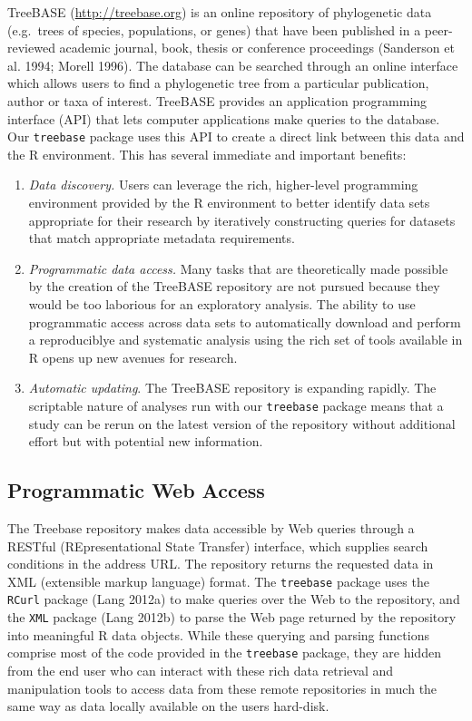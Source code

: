 TreeBASE (\href{http://treebase.org}{http://treebase.org}) is an online
repository of phylogenetic data (e.g.~trees of species, populations, or
genes) that have been published in a peer-reviewed academic journal,
book, thesis or conference proceedings (Sanderson et al. 1994; Morell
1996). The database can be searched through an online interface which
allows users to find a phylogenetic tree from a particular publication,
author or taxa of interest. TreeBASE provides an application programming
interface (API) that lets computer applications make queries to the
database. Our \texttt{treebase} package uses this API to create a direct
link between this data and the R environment. This has several immediate
and important benefits:

\begin{enumerate}
\item \emph{Data discovery.} Users can leverage the rich, higher-level
  programming environment provided by the R environment to better
  identify data sets appropriate for their research by iteratively
  constructing queries for datasets that match appropriate metadata
  requirements.
\item \emph{Programmatic data access.} Many tasks that are theoretically
  made possible by the creation of the TreeBASE repository are not
  pursued because they would be too laborious for an exploratory
  analysis. The ability to use programmatic access across data sets to
  automatically download and perform a reproduciblye and systematic
  analysis using the rich set of tools available in R opens up new
  avenues for research.
\item \emph{Automatic updating}. The TreeBASE repository is expanding
  rapidly. The scriptable nature of analyses run with our
  \texttt{treebase} package means that a study can be rerun on the
  latest version of the repository without additional effort but with
  potential new information.
\end{enumerate}

\subsection{Programmatic Web Access}

The Treebase repository makes data accessible by Web queries through a
RESTful (REpresentational State Transfer) interface, which supplies
search conditions in the address URL. The repository returns the
requested data in XML (extensible markup language) format. The
\texttt{treebase} package uses the \texttt{RCurl} package (Lang 2012a)
to make queries over the Web to the repository, and the \texttt{XML}
package (Lang 2012b) to parse the Web page returned by the repository
into meaningful R data objects. While these querying and parsing
functions comprise most of the code provided in the \texttt{treebase}
package, they are hidden from the end user who can interact with these
rich data retrieval and manipulation tools to access data from these
remote repositories in much the same way as data locally available on
the users hard-disk.

